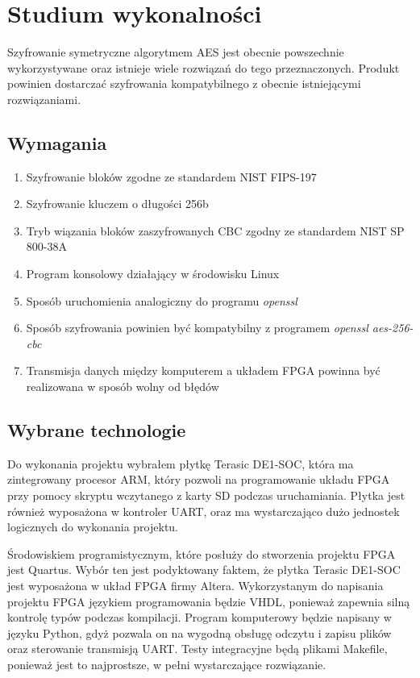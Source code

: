 \section{Studium wykonalności}
\label{sec:studium-wykonalnosci}

Szyfrowanie symetryczne algorytmem AES jest obecnie powszechnie wykorzystywane oraz istnieje wiele rozwiązań do tego przeznaczonych. Produkt powinien dostarczać szyfrowania kompatybilnego z obecnie istniejącymi rozwiązaniami.

\subsection{Wymagania}
\begin{enumerate}
\item Szyfrowanie bloków zgodne ze standardem NIST FIPS-197 \cite{aes-standard}
\item Szyfrowanie kluczem o długości 256b
\item Tryb wiązania bloków zaszyfrowanych CBC zgodny ze standardem NIST SP 800-38A \cite{cbc-standard}
\item Program konsolowy działający w środowisku Linux 
\item Sposób uruchomienia analogiczny do programu \textit{openssl}
\item Sposób szyfrowania powinien być kompatybilny z programem \textit{openssl aes-256-cbc} 
\item Transmisja danych między komputerem a układem FPGA powinna być realizowana w sposób wolny od błędów
\end{enumerate}

\subsection{Wybrane technologie}
Do wykonania projektu wybrałem płytkę Terasic DE1-SOC, która ma zintegrowany procesor ARM, który pozwoli na programowanie układu FPGA przy pomocy skryptu wczytanego z karty SD podczas uruchamiania. Płytka jest również wyposażona w kontroler UART, oraz ma wystarczająco dużo jednostek logicznych do wykonania projektu.

Środowiskiem programistycznym, które posłuży do stworzenia projektu FPGA jest Quartus. Wybór ten jest podyktowany faktem, że płytka Terasic DE1-SOC jest wyposażona w układ FPGA firmy Altera. Wykorzystanym do napisania projektu FPGA językiem programowania będzie VHDL, ponieważ zapewnia silną kontrolę typów podczas kompilacji. Program komputerowy będzie napisany w języku Python, gdyż pozwala on na wygodną obsługę odczytu i zapisu plików oraz sterowanie transmisją UART. Testy integracyjne będą plikami Makefile, ponieważ jest to najprostsze, w pełni wystarczające rozwiązanie.

